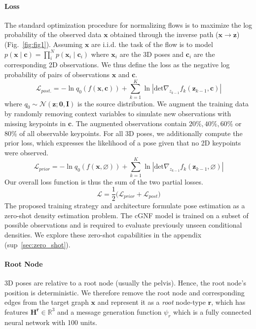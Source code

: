 \documentclass{article} \usepackage{iclr2023_conference,times}
\def\vc{{\bm{c}}}
\def\vx{{\bm{x}}}
\def\vz{{\bm{z}}}
\def\mH{{\bm{H}}}
\def\mI{{\bm{I}}}
\begin{document}
    \paragraph{Loss}
    The standard optimization procedure for normalizing flows is to maximize the log probability of the observed data $\vx$ obtained through the inverse path ($\vx \rightarrow \vz$) (Fig.~\ref{fig:fig1}).
    Assuming $\vx$ are i.i.d. the task of the flow is to model $p\left(\vx \mid \vc\right) = \prod_i^N p\left(\vx_i \mid \vc_i\right)$
    where $\vx_i$ are the 3D poses and $\vc_i$ are the corresponding 2D observations.
    We thus define the loss as the negative log probability of pairs of observations $\vx$ and $\vc$.
    \begin{equation*}
        \mathcal{L}_{post.} = -\ln q_0(f(\vx, \mathbf c)) + \sum^K_{k=1} \ln \left| \textrm{det} \nabla_{z_{k-1}} f_k(\vz_{k-1}, \vc)\right|
    \end{equation*}
    where $q_0 \sim \mathcal{N}(\vz; \mathbf{0}, \mI)$ is the source distribution.
    We augment the training data by randomly removing context variables to simulate new observations with missing keypoints in $\vc$.
    The augmented observations contain $20\%, 40\%, 60\%$ or $80\%$ of all observable keypoints.
    For all 3D poses, we additionally compute the prior loss, which expresses the likelihood of a pose given that no 2D keypoints were observed.
    \begin{equation*}
        \mathcal{L}_{prior} = -\ln q_0(f(\vx, \varnothing)) + \sum^K_{k=1} \ln\left| \textrm{det} \nabla_{z_{k-1}} f_k(\vz_{k-1}, \varnothing)\right|
    \end{equation*}
    Our overall loss function is thus the sum of the two partial losses. \begin{equation}
    \label{eq:loss}
        \mathcal{L} = \frac{1}{2}\Big(\mathcal{L}_{prior} + \mathcal{L}_{post}\Big)
    \end{equation}
    The proposed training strategy and architecture formulate pose estimation as a zero-shot density estimation problem.
    The cGNF model is trained on a subset of possible observations and is required to evaluate previously unseen conditional densities.
    We explore these zero-shot capabilities in the appendix (sup~\ref{sec:zero_shot}).
    
    \paragraph{Root Node}
    3D poses are relative to a root node (usually the pelvis).
    Hence, the root node's position is deterministic.
    We therefore remove the root node and corresponding edges from the target graph $\vx$ and represent it as a \textit{root} node-type $\mathbf{r}$, which has features $\mH^\mathbf{r} \in \mathbb{R}^3$ and a message generation function $\psi_r$ which is a fully connected neural network with 100 units.
\end{document}
